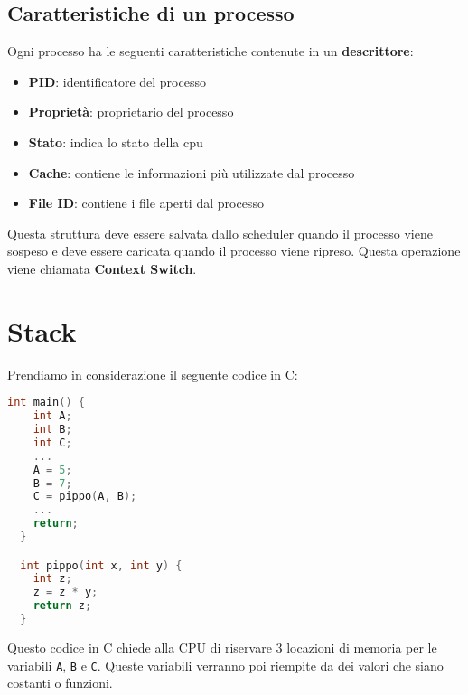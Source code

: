 \documentclass[a4paper]{article}
\theoremstyle{break}
\theoremstyle{break}
\theoremstyle{break}
\theoremstyle{break}
\begin{document}
\subsection{Caratteristiche di un processo}
Ogni processo ha le seguenti caratteristiche contenute in un \textbf{descrittore}:
\begin{itemize}
	\item \textbf{PID}: identificatore del processo
	\item \textbf{Proprietà}: proprietario del processo
	\item \textbf{Stato}: indica lo stato della cpu
	\item \textbf{Cache}: contiene le informazioni più utilizzate dal processo
	\item \textbf{File ID}: contiene i file aperti dal processo
\end{itemize}

\noindent Questa struttura deve essere salvata dallo scheduler quando il processo viene
sospeso e deve essere caricata quando il processo viene ripreso. Questa operazione
viene chiamata \textbf{Context Switch}.


\section{Stack}
Prendiamo in considerazione il seguente codice in C:
\begin{lstlisting}[language=C]
  int main() {
    int A;
    int B;
    int C;
    ...
    A = 5;
    B = 7;
    C = pippo(A, B);
    ...
    return;
  }

  int pippo(int x, int y) {
    int z;
    z = z * y;
    return z;
  }
\end{lstlisting}
Questo codice in C chiede alla CPU di riservare 3 locazioni di memoria per le variabili
\texttt{A}, \texttt{B} e \texttt{C}. Queste variabili verranno poi riempite da dei valori
che siano costanti o funzioni.
\end{document}
